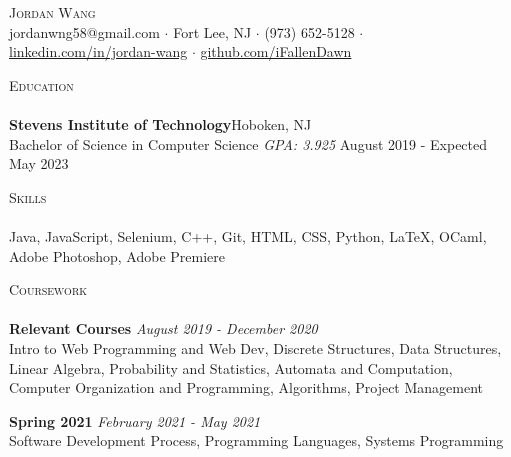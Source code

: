 \documentclass[10pt]{article}
\newcommand{\lineunder} {
    \vspace*{-8pt} \\
    \hspace*{-18pt} \hrulefill \\
}
\newcommand{\header} [1] {
    {\hspace*{-18pt}\vspace*{6pt} \textsc{#1}}
    \vspace*{-6pt} \lineunder
}
\begin{document}
\vspace*{-40pt}

    

\vspace*{2pt}
\begin{center}
	{\Huge \scshape {Jordan Wang}}\\
	jordanwng58@gmail.com $\cdot$ Fort Lee, NJ $\cdot$ (973) 652-5128 $\cdot$ \href{https://www.linkedin.com/in/jordan-wang/}{linkedin.com/in/jordan-wang} $\cdot$ \href{https://github.com/iFallenDawn}{github.com/iFallenDawn} \\
\end{center}

\header{Education}
\textbf{Stevens Institute of Technology}\hfill Hoboken, NJ\\
Bachelor of Science in Computer Science \textit{GPA: 3.925} \hfill August 2019 - Expected May 2023\\
\vspace{2mm}

\header{Skills}
	Java, JavaScript, Selenium, C++, Git, HTML, CSS, Python, \LaTeX, OCaml, Adobe Photoshop, Adobe Premiere                    \\
\vspace{2mm}

\header{Coursework}
{\textbf{Relevant Courses}} {\sl August 2019 - December 2020} \hfill 
\\
Intro to Web Programming and Web Dev, Discrete Structures, Data Structures, Linear Algebra, Probability and Statistics, Automata and Computation, Computer Organization and Programming, Algorithms, Project Management\\
\vspace*{2mm}

{\textbf{Spring 2021}} {\sl February 2021 - May 2021} \hfill 
\\
Software Development Process, Programming Languages, Systems Programming\\
\vspace*{2mm}
\ 
\end{document}
